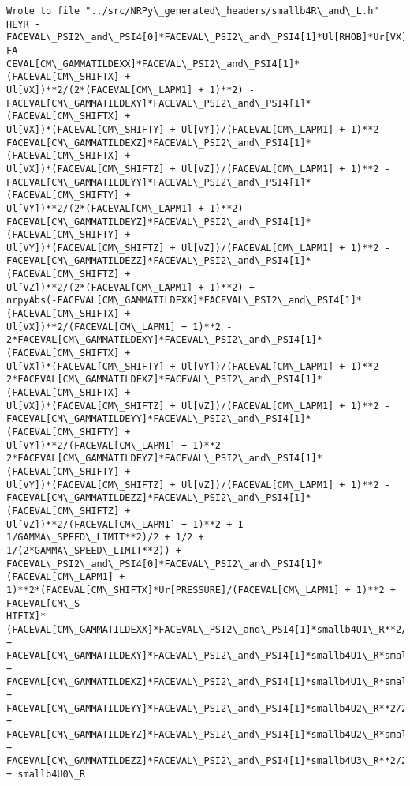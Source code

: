 \documentclass[landscape,letterpaper,10pt,english]{article}
\begin{document}
    \begin{Verbatim}[commandchars=\\\{\}]
Wrote to file "../src/NRPy\_generated\_headers/smallb4R\_and\_L.h"
HEYR -FACEVAL\_PSI2\_and\_PSI4[0]*FACEVAL\_PSI2\_and\_PSI4[1]*Ul[RHOB]*Ur[VX]/sqrt(-FA
CEVAL[CM\_GAMMATILDEXX]*FACEVAL\_PSI2\_and\_PSI4[1]*(FACEVAL[CM\_SHIFTX] +
Ul[VX])**2/(2*(FACEVAL[CM\_LAPM1] + 1)**2) -
FACEVAL[CM\_GAMMATILDEXY]*FACEVAL\_PSI2\_and\_PSI4[1]*(FACEVAL[CM\_SHIFTX] +
Ul[VX])*(FACEVAL[CM\_SHIFTY] + Ul[VY])/(FACEVAL[CM\_LAPM1] + 1)**2 -
FACEVAL[CM\_GAMMATILDEXZ]*FACEVAL\_PSI2\_and\_PSI4[1]*(FACEVAL[CM\_SHIFTX] +
Ul[VX])*(FACEVAL[CM\_SHIFTZ] + Ul[VZ])/(FACEVAL[CM\_LAPM1] + 1)**2 -
FACEVAL[CM\_GAMMATILDEYY]*FACEVAL\_PSI2\_and\_PSI4[1]*(FACEVAL[CM\_SHIFTY] +
Ul[VY])**2/(2*(FACEVAL[CM\_LAPM1] + 1)**2) -
FACEVAL[CM\_GAMMATILDEYZ]*FACEVAL\_PSI2\_and\_PSI4[1]*(FACEVAL[CM\_SHIFTY] +
Ul[VY])*(FACEVAL[CM\_SHIFTZ] + Ul[VZ])/(FACEVAL[CM\_LAPM1] + 1)**2 -
FACEVAL[CM\_GAMMATILDEZZ]*FACEVAL\_PSI2\_and\_PSI4[1]*(FACEVAL[CM\_SHIFTZ] +
Ul[VZ])**2/(2*(FACEVAL[CM\_LAPM1] + 1)**2) +
nrpyAbs(-FACEVAL[CM\_GAMMATILDEXX]*FACEVAL\_PSI2\_and\_PSI4[1]*(FACEVAL[CM\_SHIFTX] +
Ul[VX])**2/(FACEVAL[CM\_LAPM1] + 1)**2 -
2*FACEVAL[CM\_GAMMATILDEXY]*FACEVAL\_PSI2\_and\_PSI4[1]*(FACEVAL[CM\_SHIFTX] +
Ul[VX])*(FACEVAL[CM\_SHIFTY] + Ul[VY])/(FACEVAL[CM\_LAPM1] + 1)**2 -
2*FACEVAL[CM\_GAMMATILDEXZ]*FACEVAL\_PSI2\_and\_PSI4[1]*(FACEVAL[CM\_SHIFTX] +
Ul[VX])*(FACEVAL[CM\_SHIFTZ] + Ul[VZ])/(FACEVAL[CM\_LAPM1] + 1)**2 -
FACEVAL[CM\_GAMMATILDEYY]*FACEVAL\_PSI2\_and\_PSI4[1]*(FACEVAL[CM\_SHIFTY] +
Ul[VY])**2/(FACEVAL[CM\_LAPM1] + 1)**2 -
2*FACEVAL[CM\_GAMMATILDEYZ]*FACEVAL\_PSI2\_and\_PSI4[1]*(FACEVAL[CM\_SHIFTY] +
Ul[VY])*(FACEVAL[CM\_SHIFTZ] + Ul[VZ])/(FACEVAL[CM\_LAPM1] + 1)**2 -
FACEVAL[CM\_GAMMATILDEZZ]*FACEVAL\_PSI2\_and\_PSI4[1]*(FACEVAL[CM\_SHIFTZ] +
Ul[VZ])**2/(FACEVAL[CM\_LAPM1] + 1)**2 + 1 - 1/GAMMA\_SPEED\_LIMIT**2)/2 + 1/2 +
1/(2*GAMMA\_SPEED\_LIMIT**2)) +
FACEVAL\_PSI2\_and\_PSI4[0]*FACEVAL\_PSI2\_and\_PSI4[1]*(FACEVAL[CM\_LAPM1] +
1)**2*(FACEVAL[CM\_SHIFTX]*Ur[PRESSURE]/(FACEVAL[CM\_LAPM1] + 1)**2 + FACEVAL[CM\_S
HIFTX]*(FACEVAL[CM\_GAMMATILDEXX]*FACEVAL\_PSI2\_and\_PSI4[1]*smallb4U1\_R**2/2 +
FACEVAL[CM\_GAMMATILDEXY]*FACEVAL\_PSI2\_and\_PSI4[1]*smallb4U1\_R*smallb4U2\_R +
FACEVAL[CM\_GAMMATILDEXZ]*FACEVAL\_PSI2\_and\_PSI4[1]*smallb4U1\_R*smallb4U3\_R +
FACEVAL[CM\_GAMMATILDEYY]*FACEVAL\_PSI2\_and\_PSI4[1]*smallb4U2\_R**2/2 +
FACEVAL[CM\_GAMMATILDEYZ]*FACEVAL\_PSI2\_and\_PSI4[1]*smallb4U2\_R*smallb4U3\_R +
FACEVAL[CM\_GAMMATILDEZZ]*FACEVAL\_PSI2\_and\_PSI4[1]*smallb4U3\_R**2/2 + smallb4U0\_R

\end{Verbatim}
\end{document}
